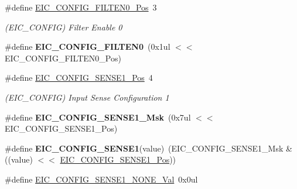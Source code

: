 \begin{DoxyCompactItemize}
\item 
\hypertarget{group___s_a_m_l21___e_i_c_gaa17527a9aab80477ff20ed73d2d7177a}{}\#define \hyperlink{group___s_a_m_l21___e_i_c_gaa17527a9aab80477ff20ed73d2d7177a}{E\+I\+C\+\_\+\+C\+O\+N\+F\+I\+G\+\_\+\+F\+I\+L\+T\+E\+N0\+\_\+\+Pos}~3\label{group___s_a_m_l21___e_i_c_gaa17527a9aab80477ff20ed73d2d7177a}

\begin{DoxyCompactList}\small\item\em (E\+I\+C\+\_\+\+C\+O\+N\+F\+I\+G) Filter Enable 0 \end{DoxyCompactList}\item 
\hypertarget{group___s_a_m_l21___e_i_c_gaf3dda3c75f2f02a4d4c532526cc29230}{}\#define {\bfseries E\+I\+C\+\_\+\+C\+O\+N\+F\+I\+G\+\_\+\+F\+I\+L\+T\+E\+N0}~(0x1ul $<$$<$ E\+I\+C\+\_\+\+C\+O\+N\+F\+I\+G\+\_\+\+F\+I\+L\+T\+E\+N0\+\_\+\+Pos)\label{group___s_a_m_l21___e_i_c_gaf3dda3c75f2f02a4d4c532526cc29230}

\item 
\hypertarget{group___s_a_m_l21___e_i_c_gab34794f88d0b20fa2792afe7fecd7fc1}{}\#define \hyperlink{group___s_a_m_l21___e_i_c_gab34794f88d0b20fa2792afe7fecd7fc1}{E\+I\+C\+\_\+\+C\+O\+N\+F\+I\+G\+\_\+\+S\+E\+N\+S\+E1\+\_\+\+Pos}~4\label{group___s_a_m_l21___e_i_c_gab34794f88d0b20fa2792afe7fecd7fc1}

\begin{DoxyCompactList}\small\item\em (E\+I\+C\+\_\+\+C\+O\+N\+F\+I\+G) Input Sense Configuration 1 \end{DoxyCompactList}\item 
\hypertarget{group___s_a_m_l21___e_i_c_ga77aa5f88d3ea77e93becbd87eec2ffde}{}\#define {\bfseries E\+I\+C\+\_\+\+C\+O\+N\+F\+I\+G\+\_\+\+S\+E\+N\+S\+E1\+\_\+\+Msk}~(0x7ul $<$$<$ E\+I\+C\+\_\+\+C\+O\+N\+F\+I\+G\+\_\+\+S\+E\+N\+S\+E1\+\_\+\+Pos)\label{group___s_a_m_l21___e_i_c_ga77aa5f88d3ea77e93becbd87eec2ffde}

\item 
\hypertarget{group___s_a_m_l21___e_i_c_ga1ce58639b6e0135e1061584726b1c705}{}\#define {\bfseries E\+I\+C\+\_\+\+C\+O\+N\+F\+I\+G\+\_\+\+S\+E\+N\+S\+E1}(value)~(E\+I\+C\+\_\+\+C\+O\+N\+F\+I\+G\+\_\+\+S\+E\+N\+S\+E1\+\_\+\+Msk \& ((value) $<$$<$ \hyperlink{group___s_a_m_l21___e_i_c_gab34794f88d0b20fa2792afe7fecd7fc1}{E\+I\+C\+\_\+\+C\+O\+N\+F\+I\+G\+\_\+\+S\+E\+N\+S\+E1\+\_\+\+Pos}))\label{group___s_a_m_l21___e_i_c_ga1ce58639b6e0135e1061584726b1c705}

\item 
\hypertarget{group___s_a_m_l21___e_i_c_ga2dd12fe5d69cac11eb3b807a1ba2972a}{}\#define \hyperlink{group___s_a_m_l21___e_i_c_ga2dd12fe5d69cac11eb3b807a1ba2972a}{E\+I\+C\+\_\+\+C\+O\+N\+F\+I\+G\+\_\+\+S\+E\+N\+S\+E1\+\_\+\+N\+O\+N\+E\+\_\+\+Val}~0x0ul\label{group___s_a_m_l21___e_i_c_ga2dd12fe5d69cac11eb3b807a1ba2972a}


\end{DoxyCompactItemize}
